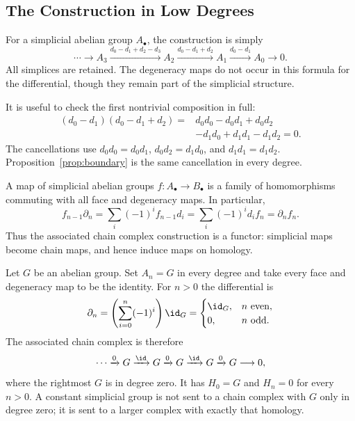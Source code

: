 \documentclass[11pt]{article}
\begin{document}
\subsection{The Construction in Low Degrees}
For a simplicial abelian group $A_\bullet$, the construction is simply
\[
\cdots\longrightarrow A_3\xrightarrow{d_0-d_1+d_2-d_3}
A_2\xrightarrow{d_0-d_1+d_2}A_1\xrightarrow{d_0-d_1}A_0\longrightarrow0.
\]
All simplices are retained. The degeneracy maps do not occur in this formula for the differential, though they remain part of the simplicial structure.

It is useful to check the first nontrivial composition in full:
\[
\begin{aligned}
(d_0-d_1)(d_0-d_1+d_2)
={}&d_0d_0-d_0d_1+d_0d_2\\
&-d_1d_0+d_1d_1-d_1d_2=0.
\end{aligned}
\]
The cancellations use $d_0d_0=d_0d_1$, $d_0d_2=d_1d_0$, and $d_1d_1=d_1d_2$. Proposition~\ref{prop:boundary} is the same cancellation in every degree.

A map of simplicial abelian groups $f:A_\bullet\to B_\bullet$ is a family of homomorphisms commuting with all face and degeneracy maps. In particular,
\[
f_{n-1}\partial_n
=\sum_i(-1)^i f_{n-1}d_i
=\sum_i(-1)^i d_i f_n
=\partial_n f_n.
\]
Thus the associated chain complex construction is a functor: simplicial maps become chain maps, and hence induce maps on homology.

\begin{example}
Let $G$ be an abelian group. Set $A_n=G$ in every degree and take every face and degeneracy map to be the identity. For $n>0$ the differential is
\[
\partial_n=\left(\sum_{i=0}^n(-1)^i\right)\id_G
=\begin{cases}\id_G,&n\text{ even},\\0,&n\text{ odd}.\end{cases}
\]
The associated chain complex is therefore
\[
\cdots\xrightarrow{0}G\xrightarrow{\id}G\xrightarrow{0}G
\xrightarrow{\id}G\xrightarrow{0}G\longrightarrow0,
\]
where the rightmost $G$ is in degree zero. It has $H_0=G$ and $H_n=0$ for every $n>0$. A constant simplicial group is not sent to a chain complex with $G$ only in degree zero; it is sent to a larger complex with exactly that homology.
\end{example}
\end{document}
